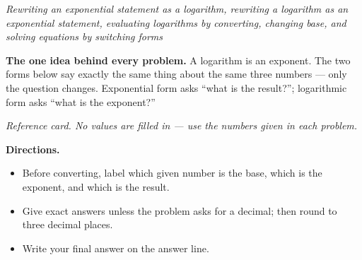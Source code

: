 \documentclass[12pt]{article}
\begin{document}

\begin{center}
\textit{Rewriting an exponential statement as a logarithm, rewriting a logarithm
as an exponential statement, evaluating logarithms by converting, changing base,
and solving equations by switching forms}
\end{center}

\noindent\textbf{The one idea behind every problem.} A logarithm is an exponent.
The two forms below say exactly the same thing about the same three numbers ---
only the question changes. Exponential form asks ``what is the result?'';
logarithmic form asks ``what is the exponent?''

\begin{center}

\smallskip
\small\textit{Reference card. No values are filled in --- use the numbers given
in each problem.}\normalsize
\end{center}

\noindent\textbf{Directions.}
\begin{itemize}[leftmargin=1.2cm, itemsep=2pt, topsep=2pt]
\item Before converting, label which given number is the base, which is the
exponent, and which is the result.
\item Give exact answers unless the problem asks for a decimal; then round to
three decimal places.
\item Write your final answer on the answer line.
\end{itemize}


\end{document}
